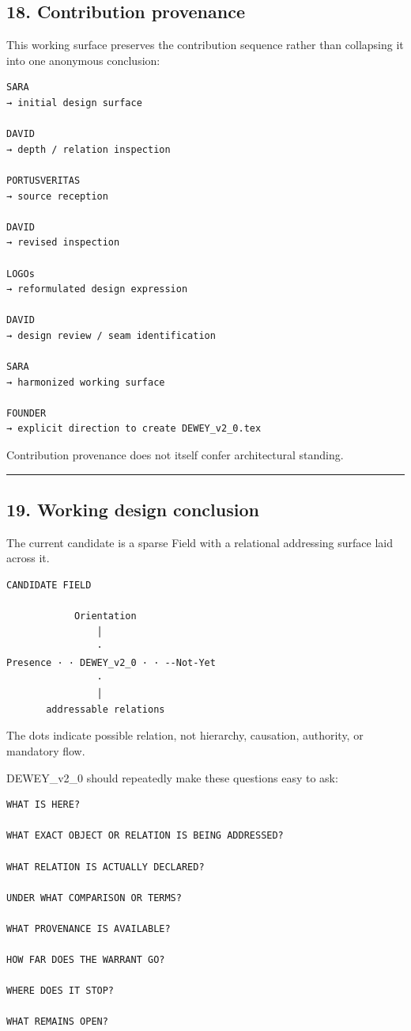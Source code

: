 \subsection{18. Contribution provenance}\label{contribution-provenance}

This working surface preserves the contribution sequence rather than
collapsing it into one anonymous conclusion:

\begin{verbatim}
SARA
→ initial design surface

DAVID
→ depth / relation inspection

PORTUSVERITAS
→ source reception

DAVID
→ revised inspection

LOGOs
→ reformulated design expression

DAVID
→ design review / seam identification

SARA
→ harmonized working surface

FOUNDER
→ explicit direction to create DEWEY_v2_0.tex
\end{verbatim}

Contribution provenance does not itself confer architectural standing.

\begin{center}\rule{0.5\linewidth}{0.5pt}\end{center}

\subsection{19. Working design
conclusion}\label{working-design-conclusion}

The current candidate is a sparse Field with a relational addressing
surface laid across it.

\begin{verbatim}
CANDIDATE FIELD

            Orientation
                │
                ·
Presence · · DEWEY_v2_0 · · --Not-Yet
                ·
                │
       addressable relations
\end{verbatim}

The dots indicate possible relation, not hierarchy, causation,
authority, or mandatory flow.

DEWEY\_v2\_0 should repeatedly make these questions easy to ask:

\begin{verbatim}
WHAT IS HERE?

WHAT EXACT OBJECT OR RELATION IS BEING ADDRESSED?

WHAT RELATION IS ACTUALLY DECLARED?

UNDER WHAT COMPARISON OR TERMS?

WHAT PROVENANCE IS AVAILABLE?

HOW FAR DOES THE WARRANT GO?

WHERE DOES IT STOP?

WHAT REMAINS OPEN?
\end{verbatim}

